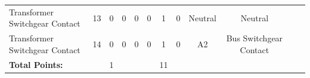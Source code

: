 \begin{table}[!htp]
{\begin{tabular}{lcccccccccll}
			Transformer Switchgear Contact  & 13                      & 0                                           & 0                                          & 0           & 0           & 1            & 0                & Neutral & Neutral                             &                                                   \\
			Transformer Switchgear Contact  & 14                      & 0                                           & 0                                          & 0           & 0           & 1            & 0                & A2      & Bus Switchgear Contact              &                                                   \\ \midrule
			\textbf{Total Points:}          &                         & 1                                           &                                            &             &             & 11           &                  &         &                                     &                                  &                \\ \bottomrule
		\end{tabular}
	}
\end{table}
